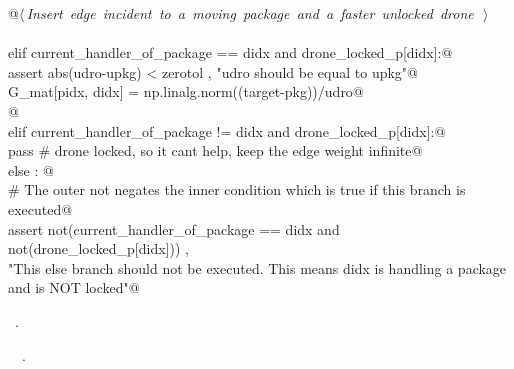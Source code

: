 \documentclass[10pt, english, oneside]{report}
\begin{document}
\begin{flushleft}
\begin{minipage}{\linewidth}
\begin{list}{}{}
\mbox{}\verb@                      @\hbox{$\langle\,${\itshape Insert edge incident to a moving package and a faster unlocked drone}\nobreak\ {\footnotesize {}}$\,\rangle$}\verb@@\\
\mbox{}\verb@@\\
\mbox{}\verb@        elif current_handler_of_package == didx and drone_locked_p[didx]:@\\
\mbox{}\verb@               assert abs(udro-upkg) < zerotol , "udro should be equal to upkg"@\\
\mbox{}\verb@               G_mat[pidx, didx] = np.linalg.norm((target-pkg))/udro@\\
\mbox{}\verb@    @\\
\mbox{}\verb@        elif current_handler_of_package != didx and drone_locked_p[didx]:@\\
\mbox{}\verb@               pass # drone locked, so it cant help, keep the edge weight infinite@\\
\mbox{}\verb@        else : @\\
\mbox{}\verb@               # The outer not negates the inner condition which is true if this branch is executed@\\
\mbox{}\verb@               assert not(current_handler_of_package == didx and not(drone_locked_p[didx])) ,\@\\
\mbox{}\verb@            "This else branch should not be executed. This means didx is handling a package and is NOT locked"@\\
\mbox{}\verb@@{\NWsep}
\end{list}
\vspace{-1.5ex}
\footnotesize
\begin{list}{}{\setlength{\itemsep}{-\parsep}\setlength{\itemindent}{-\leftmargin}}
\item \NWtxtMacroRefIn\ .
\item \NWtxtIdentsUsed\nobreak\  \verb@packagelabel@\nobreak\ .
\item{}
\end{list}
\end{minipage}\vspace{4ex}
\end{flushleft}
\end{document}
